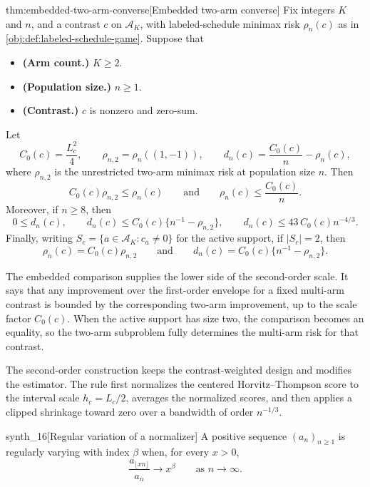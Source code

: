 \begin{theoremv}{thm:embedded-two-arm-converse}[Embedded two-arm converse]
Fix integers \(K\) and \(n\), and a contrast \(c\) on \(\mathcal A_K\), with labeled-schedule minimax risk \(\rho_n(c)\) as in \cref{obj:def:labeled-schedule-game}. Suppose that
\begin{itemize}
\item \textbf{(Arm count.)} \(K\geq 2\).
\item \textbf{(Population size.)} \(n\geq 1\).
\item \textbf{(Contrast.)} \(c\) is nonzero and zero-sum.
\end{itemize}
Let
\[
C_0(c)=\frac{L_c^2}{4},
\qquad
\rho_{n,2}=\rho_n((1,-1)),
\qquad
d_n(c)=\frac{C_0(c)}{n}-\rho_n(c),
\]
where \(\rho_{n,2}\) is the unrestricted two-arm minimax risk at population size \(n\). Then
\[
C_0(c)\rho_{n,2}\leq \rho_n(c)
\qquad\text{and}\qquad
\rho_n(c)\leq \frac{C_0(c)}{n}.
\]
Moreover, if \(n\geq 8\), then
\[
0\leq d_n(c),
\qquad
d_n(c)\leq C_0(c)\{n^{-1}-\rho_{n,2}\},
\qquad
d_n(c)\leq 43\,C_0(c)n^{-4/3}.
\]
Finally, writing \(S_c=\{a\in\mathcal A_K:c_a\neq 0\}\) for the active support, if \(|S_c|=2\), then
\[
\rho_n(c)=C_0(c)\rho_{n,2}
\qquad\text{and}\qquad
d_n(c)=C_0(c)\{n^{-1}-\rho_{n,2}\}.
\]
\end{theoremv}

The embedded comparison supplies the lower side of the second-order scale. It says that any improvement over the first-order envelope for a fixed multi-arm contrast is bounded by the corresponding two-arm improvement, up to the scale factor \(C_0(c)\). When the active support has size two, the comparison becomes an equality, so the two-arm subproblem fully determines the multi-arm risk for that contrast.

The second-order construction keeps the contrast-weighted design and modifies the estimator. The rule first normalizes the centered Horvitz--Thompson score to the interval scale \(h_c=L_c/2\), averages the normalized scores, and then applies a clipped shrinkage toward zero over a bandwidth of order \(n^{-1/3}\).

\begin{definitionv}{synth_16}[Regular variation of a normalizer]
A positive sequence \((a_n)_{n\ge1}\) is regularly varying with index \(\beta\) when, for every \(x>0\), \[ \frac{a_{\lfloor xn\rfloor}}{a_n}\longrightarrow x^\beta \qquad\text{as }n\to\infty . \]
\end{definitionv}

